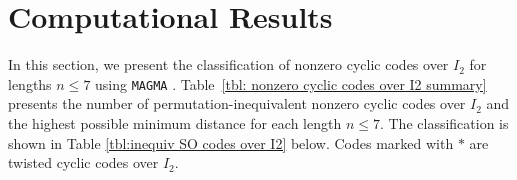 \documentclass[12pt]{article}
\theoremstyle{definition}
\theoremstyle{plain}
\begin{document}
\section{Computational Results}
\label{sec: comp results}



In this section, we present the classification of nonzero cyclic codes over $I_2$ for lengths $n \le 7$ using \texttt{MAGMA} \cite{MAGMA}.
Table~\ref{tbl: nonzero cyclic codes over I2 summary} presents the number of permutation-inequivalent nonzero cyclic codes over $I_2$ and the highest possible minimum distance for each length $n \le 7$.
The classification is shown in Table \ref{tbl:inequiv SO codes over I2} below.
Codes marked with $*$ are twisted cyclic codes over $I_2$.




\begin{table}[H]
\centering
\setlength{\tabcolsep}{12.0pt}
\renewcommand{\arraystretch}{1.05}
{\fontsize{10pt}{11.2pt}\selectfont
\caption{Number of Permutation-Inequivalent Nonzero Cyclic Codes over $I_2$ of Length $n \le 7$}  \label{tbl: nonzero cyclic codes over I2 summary}
}
\end{table}
\end{document}
